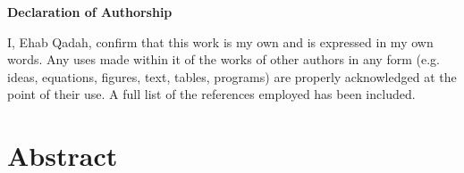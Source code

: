 \documentclass[12pt, %
a4paper, %
twoside, %
openright, %
abstract=on, %
DIV=11,      %
BCOR=8mm,openright]{scrbook}
\begin{document}
	\frontmatter
	
	

	\vspace{4cm}
	
	
	\thispagestyle{empty}
	{\noindent%
		\huge{\textbf{\textsf{Declaration of Authorship}}}
	}
	\vspace{2cm}
	\begin{flushleft}
		\noindent%
		I, Ehab Qadah, confirm that this work is my own and is expressed in my own words. Any
		uses made within it of the works of other authors in any form (e.g. ideas, equations, figures,
		text, tables, programs) are properly acknowledged at the point of their use. A full list of the
		references employed has been included.
	\end{flushleft}
	
	

	\chapter*{Abstract}
	\thispagestyle{empty}
    
    
	
	\tableofcontents
	\thispagestyle{empty}
	\listoffigures
	
	\mainmatter
	
	
	
	
	
	
	
	

	
	
	
	
	\FloatBarrier
	

	
	 
\end{document}
